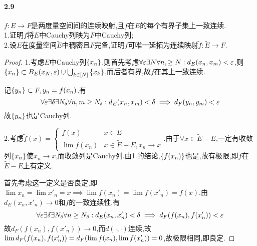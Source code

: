 \documentclass[UTF8]{article}
\begin{document}
\paragraph*{2.9}$f:E\to F$是两度量空间间的连续映射,且$f$在$E$的每个有界子集上一致连续.\\
1.证明$f$将$E$中Cauchy列映为$F$中Cauchy列;\\
2.设$E$在度量空间$\tilde{E}$中稠密且$F$完备,证明$f$可唯一延拓为连续映射$\tilde{f}:\tilde{E}\to F$.
\begin{proof}
    1.考虑$E$中Cauchy列$\left\{x_n\right\}$,则首先考虑$\forall \varepsilon \exists N\forall n,\geq N:d_E(x_n,x_m)<\varepsilon$,则$ \left\{x_n\right\}\subset B_E(x_N,\varepsilon)\cup\bigcup_{k\in [N]}\left\{x_k\right\}$,而后者有界,故$f$在其上一致连续.

    记$\left\{y_n\right\}\subset F, y_n=f(x_n)$.有$$\forall \varepsilon \exists \delta \exists N_\delta \forall n,m\geq N_\delta:d_E(x_n,x_m)<\delta\implies d_F(y_n,y_m)<\varepsilon$$
    故$\left\{y_n\right\}$也是Cauchy列.

    2.考虑$\tilde{f}(x)=\begin{cases}
        f(x)&x\in E\\ \lim f(x_n)&x\in \tilde{E}-E, x_n\to x
    \end{cases}.$由于$\forall x\in \tilde{E}-E$,一定有收敛列$\left\{x_n\right\}$使$x_n\to x$,而收敛列是Cauchy列.由1.的结论,$\left\{f(x_n)\right\}$也是,故有极限,即$\tilde{f}$在$\tilde{E}-E$上有定义.

    首先考虑这一定义是否良定,即$\lim x_n=\lim x'_n=x\implies \lim f(x_n)=\lim f(x'_n)=f(x)$.由$d_E(x_n,x'_n)\to 0$和$f$的一致连续性,有$$\forall\varepsilon \exists \delta\exists N_\delta\forall n\geq N_\delta:d_E(x_n,x'_n)<\delta\implies d_F(f(x_n),f(x'_n))<\varepsilon$$
    故$d_F(f(x_n),f(x'_n))\to 0$,而$d(\cdot,\cdot)$连续,故$\lim d_F(f(x_n),f(x'_n))=d_F\!\left(\lim f(x_n),\lim f(x'_n)\right)=0$,故极限相同,即良定.


\end{proof}
\end{document}
